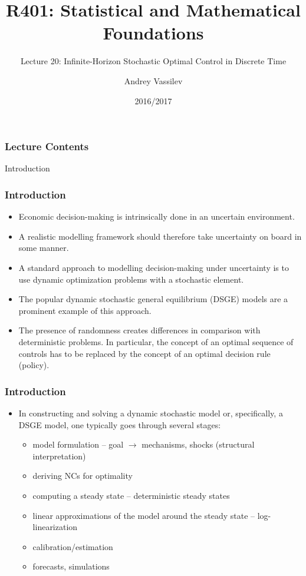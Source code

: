 \documentclass[10pt]{beamer}
\title{R401: Statistical and Mathematical Foundations}
\subtitle{Lecture 20: Infinite-Horizon Stochastic Optimal Control in Discrete Time}
\author{Andrey Vassilev}
\date{2016/2017}
\theoremstyle{definition}
\begin{document}
\maketitle



\begin{frame}[fragile]
\frametitle{Lecture Contents}
\tableofcontents
\end{frame}

\begin{section}{Introduction}\label{sec:intro}

\begin{frame}
\frametitle{Introduction}
\begin{itemize}\itemsep1em
\item Economic decision-making is intrinsically done in an uncertain environment.
\item A realistic modelling framework should therefore take uncertainty on board in some manner.
\item A standard approach to modelling decision-making under uncertainty is to use dynamic optimization problems with a stochastic element.
\item The popular dynamic stochastic general equilibrium (DSGE) models are a prominent example of this approach.
\item The presence of randomness creates differences in comparison with deterministic problems. In particular, the concept of an optimal sequence of controls has to be replaced by the concept of an optimal decision rule (policy).
\end{itemize}
\end{frame}


\begin{frame}
\frametitle{Introduction}
\begin{itemize}\itemsep1em
\item In constructing and solving a dynamic stochastic model or, specifically, a DSGE model, one typically goes through several stages:
\begin{itemize}\itemsep1em
  \item model formulation -- goal $\rightarrow$ mechanisms, shocks (structural interpretation)
  \item deriving NCs for optimality
  \item computing a steady state -- deterministic steady states 
  \item linear approximations of the model around the steady state -- log-linearization 
  \item calibration/estimation 
  \item forecasts, simulations
\end{itemize}
\end{itemize}
\end{frame}




\end{section}
\end{document}
